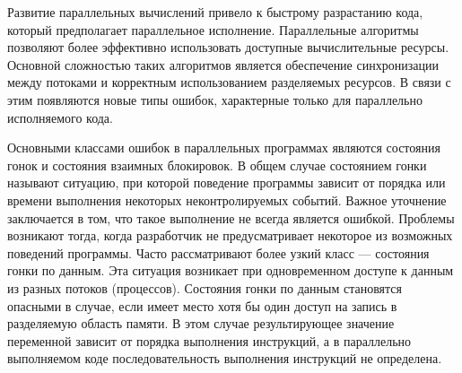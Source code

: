 
Развитие параллельных вычислений привело к быстрому разрастанию кода, который предполагает параллельное исполнение.
Параллельные алгоритмы позволяют более эффективно использовать доступные вычислительные ресурсы.
Основной сложностью таких алгоритмов является обеспечение синхронизации между потоками и корректным использованием разделяемых ресурсов.
В связи с этим появляются новые типы ошибок, характерные только для параллельно исполняемого кода. 

Основными классами ошибок в параллельных программах являются состояния гонок и состояния взаимных блокировок.
В общем случае состоянием гонки называют ситуацию, при которой поведение программы зависит от порядка или времени выполнения некоторых неконтролируемых событий.
Важное уточнение заключается в том, что такое выполнение не всегда является ошибкой.
Проблемы возникают тогда, когда разработчик не предусматривает некоторое из возможных поведений программы.
Часто рассматривают более узкий класс — состояния гонки по данным. Эта ситуация возникает при одновременном доступе к данным из разных потоков (процессов).
Состояния гонки по данным становятся опасными в случае, если имеет место хотя бы один доступ на запись в разделяемую область памяти.
В этом случае результирующее значение переменной зависит от порядка выполнения инструкций, а в параллельно выполняемом коде последовательность выполнения инструкций не определена. 

 
